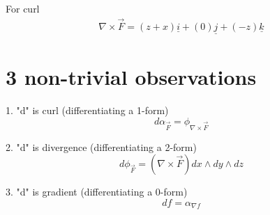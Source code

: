 For curl
\begin{align*}
   \nabla \times \vec{F} = \left( z + x \right) \underline{i} + \left( 0 \right) \underline{j} + \left( -z \right) \underline{k}
\end{align*}

\section{3 non-trivial observations}
1. "d" is curl (differentiating a 1-form)
\[
   d \alpha_{\vec{F}} = \phi_{\nabla \times \vec{F}} 
\] 

2. "d" is divergence (differentiating a 2-form)
\[
   d \phi_{\vec{F}} = \left( \nabla \times \vec{F} \right) dx \wedge dy \wedge dz
\] 

3. "d" is gradient (differentiating a 0-form)
\[
   df = \alpha_{\nabla f}
\] 

